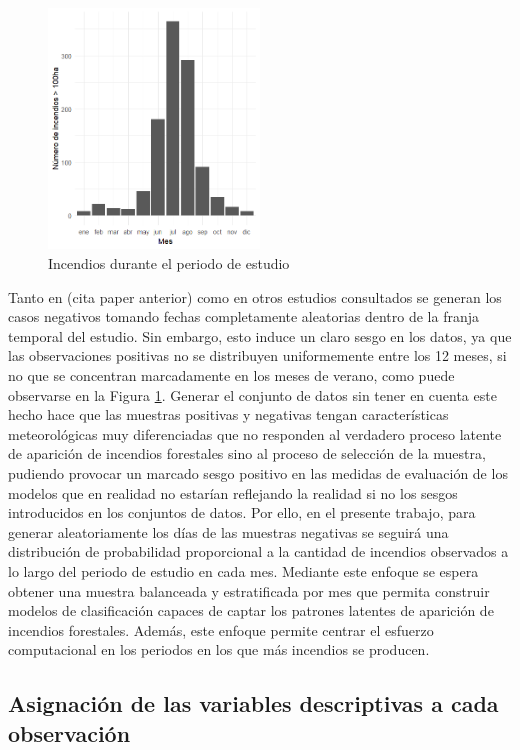 \documentclass[12pt,a4paper,]{book}
\numberwithin{dummy}{section}
\theoremstyle{ocrenumbox}
\theoremstyle{blacknumex}
\theoremstyle{blacknumbox}
\theoremstyle{ocrenum}
\theoremstyle{ocrenum}
\begin{document}
\begin{figure}[htb]
\centering
\includegraphics[width=0.5\textwidth]{graficos/incendios_mes.png}
\caption{Incendios durante el periodo de estudio}
\label{fig:incendios_mes}
\end{figure}

Tanto en (cita paper anterior) como en otros estudios consultados se
generan los casos negativos tomando fechas completamente aleatorias
dentro de la franja temporal del estudio. Sin embargo, esto induce un
claro sesgo en los datos, ya que las observaciones positivas no se
distribuyen uniformemente entre los 12 meses, si no que se concentran
marcadamente en los meses de verano, como puede observarse en la Figura
\ref{fig:incendios_mes}. Generar el conjunto de datos sin tener en
cuenta este hecho hace que las muestras positivas y negativas tengan
características meteorológicas muy diferenciadas que no responden al
verdadero proceso latente de aparición de incendios forestales sino al
proceso de selección de la muestra, pudiendo provocar un marcado sesgo
positivo en las medidas de evaluación de los modelos que en realidad no
estarían reflejando la realidad si no los sesgos introducidos en los
conjuntos de datos. Por ello, en el presente trabajo, para generar
aleatoriamente los días de las muestras negativas se seguirá una
distribución de probabilidad proporcional a la cantidad de incendios
observados a lo largo del periodo de estudio en cada mes. Mediante este
enfoque se espera obtener una muestra balanceada y estratificada por mes
que permita construir modelos de clasificación capaces de captar los
patrones latentes de aparición de incendios forestales. Además, este
enfoque permite centrar el esfuerzo computacional en los periodos en los
que más incendios se producen.

\hypertarget{asignaciuxf3n-de-las-variables-descriptivas-a-cada-observaciuxf3n}{%
\subsection{Asignación de las variables descriptivas a cada
observación}\label{asignaciuxf3n-de-las-variables-descriptivas-a-cada-observaciuxf3n}}
\end{document}
